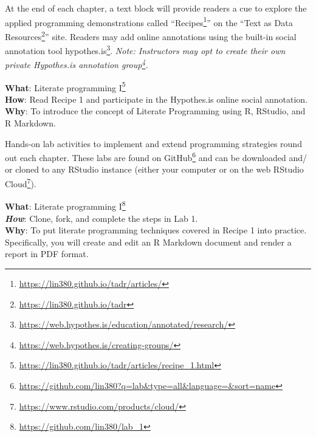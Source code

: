 \documentclass[
  letterpaper,
]{scrbook}
\DeclareRobustCommand{\href}[2]{#2\footnote{\url{#1}}}
\begin{document}
At the end of each chapter, a text block will provide readers a cue to
explore the applied programming demonstrations called
``\href{https://lin380.github.io/tadr/articles/}{Recipes}'' on the
``\href{https://lin380.github.io/tadr}{Text as Data Resources}'' site.
Readers may add online annotations using the built-in social annotation
tool
\href{https://web.hypothes.is/education/annotated/research/}{hypothes.is}.
\emph{Note: Instructors may opt to
\href{https://web.hypothes.is/creating-groups/}{create their own private
Hypothes.is annotation group}.}

\begin{tcolorbox}[enhanced jigsaw, title=\textcolor{quarto-callout-tip-color}{\faLightbulb}\hspace{0.5em}{Recipe}, breakable, colback=white, colframe=quarto-callout-tip-color-frame, bottomrule=.15mm, left=2mm, bottomtitle=1mm, colbacktitle=quarto-callout-tip-color!10!white, opacityback=0, arc=.35mm, toprule=.15mm, coltitle=black, leftrule=.75mm, opacitybacktitle=0.6, toptitle=1mm, titlerule=0mm, rightrule=.15mm]

\textbf{What}:
\href{https://lin380.github.io/tadr/articles/recipe_1.html}{Literate
programming I}\\
\textbf{How}: Read Recipe 1 and participate in the Hypothes.is online
social annotation.\\
\textbf{Why}: To introduce the concept of Literate Programming using R,
RStudio, and R Markdown.

\end{tcolorbox}

Hands-on lab activities to implement and extend programming strategies
round out each chapter. These labs are found on
\href{https://github.com/lin380?q=lab\&type=all\&language=\&sort=name}{GitHub}
and can be downloaded and/ or cloned to any RStudio instance (either
your computer or on the web
\href{https://www.rstudio.com/products/cloud/}{RStudio Cloud}).

\begin{tcolorbox}[enhanced jigsaw, title=\textcolor{quarto-callout-tip-color}{\faLightbulb}\hspace{0.5em}{Lab}, breakable, colback=white, colframe=quarto-callout-tip-color-frame, bottomrule=.15mm, left=2mm, bottomtitle=1mm, colbacktitle=quarto-callout-tip-color!10!white, opacityback=0, arc=.35mm, toprule=.15mm, coltitle=black, leftrule=.75mm, opacitybacktitle=0.6, toptitle=1mm, titlerule=0mm, rightrule=.15mm]

\textbf{What}: \href{https://github.com/lin380/lab_1}{Literate
programming I}\\
\textbf{\emph{How}}: Clone, fork, and complete the steps in Lab 1.\\
\textbf{Why}: To put literate programming techniques covered in Recipe 1
into practice. Specifically, you will create and edit an R Markdown
document and render a report in PDF format.

\end{tcolorbox}
\end{document}
